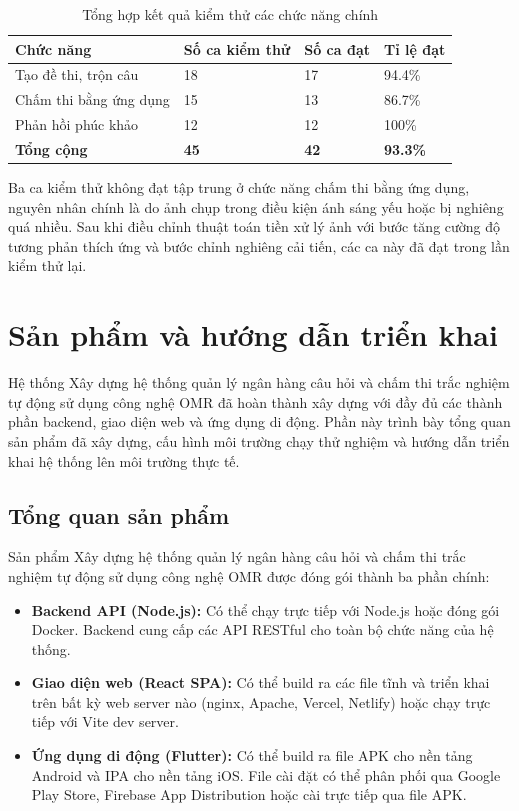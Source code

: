 ﻿\documentclass[../DoAn.tex]{subfiles}
\begin{document}
\begin{table}[H]
\centering
\begin{tabular}{|p{4cm}|p{3cm}|p{3cm}|p{3cm}|}
\hline
\textbf{Chức năng} & \textbf{Số ca kiểm thử} & \textbf{Số ca đạt} & \textbf{Tỉ lệ đạt} \\ \hline
Tạo đề thi, trộn câu & 18 & 17 & 94.4\% \\ \hline
Chấm thi bằng ứng dụng & 15 & 13 & 86.7\% \\ \hline
Phản hồi phúc khảo & 12 & 12 & 100\% \\ \hline
\textbf{Tổng cộng} & \textbf{45} & \textbf{42} & \textbf{93.3\%} \\ \hline
\end{tabular}
\caption{Tổng hợp kết quả kiểm thử các chức năng chính}
\label{table:4.3}
\end{table}

Ba ca kiểm thử không đạt tập trung ở chức năng chấm thi bằng ứng dụng, nguyên nhân chính là do ảnh chụp trong điều kiện ánh sáng yếu hoặc bị nghiêng quá nhiều. Sau khi điều chỉnh thuật toán tiền xử lý ảnh với bước tăng cường độ tương phản thích ứng và bước chỉnh nghiêng cải tiến, các ca này đã đạt trong lần kiểm thử lại.

\section{Sản phẩm và hướng dẫn triển khai}
\label{section:4.5}

Hệ thống Xây dựng hệ thống quản lý ngân hàng câu hỏi và chấm thi trắc nghiệm tự động sử dụng công nghệ OMR đã hoàn thành xây dựng với đầy đủ các thành phần backend, giao diện web và ứng dụng di động. Phần này trình bày tổng quan sản phẩm đã xây dựng, cấu hình môi trường chạy thử nghiệm và hướng dẫn triển khai hệ thống lên môi trường thực tế.

\subsection{Tổng quan sản phẩm}

Sản phẩm Xây dựng hệ thống quản lý ngân hàng câu hỏi và chấm thi trắc nghiệm tự động sử dụng công nghệ OMR được đóng gói thành ba phần chính:

\begin{itemize}
    \item \textbf{Backend API (Node.js):} Có thể chạy trực tiếp với Node.js hoặc đóng gói Docker. Backend cung cấp các API RESTful cho toàn bộ chức năng của hệ thống.
    \item \textbf{Giao diện web (React SPA):} Có thể build ra các file tĩnh và triển khai trên bất kỳ web server nào (nginx, Apache, Vercel, Netlify) hoặc chạy trực tiếp với Vite dev server.
    \item \textbf{Ứng dụng di động (Flutter):} Có thể build ra file APK cho nền tảng Android và IPA cho nền tảng iOS. File cài đặt có thể phân phối qua Google Play Store, Firebase App Distribution hoặc cài trực tiếp qua file APK.
\end{itemize}
\end{document}
